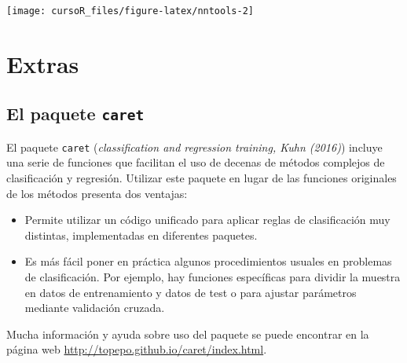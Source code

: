 \documentclass[]{book}
\begin{document}
\begin{center}\texttt{[image: cursoR\_files/figure-latex/nntools-2]} \end{center}

\chapter{Extras}\label{extras}

\section{\texorpdfstring{El paquete
\texttt{caret}}{El paquete caret}}\label{el-paquete-caret}

El paquete \texttt{caret} (\emph{classification and regression training,
Kuhn (2016)}) incluye una serie de funciones que facilitan el uso de
decenas de métodos complejos de clasificación y regresión. Utilizar este
paquete en lugar de las funciones originales de los métodos presenta dos
ventajas:

\begin{itemize}
\item
  Permite utilizar un código unificado para aplicar reglas de
  clasificación muy distintas, implementadas en diferentes paquetes.
\item
  Es más fácil poner en práctica algunos procedimientos usuales en
  problemas de clasificación. Por ejemplo, hay funciones específicas
  para dividir la muestra en datos de entrenamiento y datos de test o
  para ajustar parámetros mediante validación cruzada.
\end{itemize}

Mucha información y ayuda sobre uso del paquete se puede encontrar en la
página web \url{http://topepo.github.io/caret/index.html}.


\end{document}
